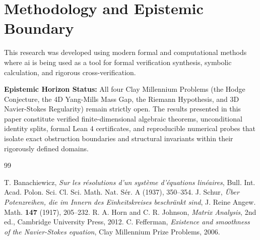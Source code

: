 \documentclass[11pt,a4paper]{article}
\theoremstyle{definition}
\begin{document}
\section{Methodology and Epistemic Boundary}
\noindent This research was developed using modern formal and computational methods where ai is being used as a tool for formal verification synthesis, symbolic calculation, and rigorous cross-verification.

\vspace{0.5em}
\noindent\textbf{Epistemic Horizon Status:} All four Clay Millennium Problems (the Hodge Conjecture, the 4D Yang-Mills Mass Gap, the Riemann Hypothesis, and 3D Navier-Stokes Regularity) remain strictly open. The results presented in this paper constitute verified finite-dimensional algebraic theorems, unconditional identity splits, formal Lean 4 certificates, and reproducible numerical probes that isolate exact obstruction boundaries and structural invariants within their rigorously defined domains.

\begin{thebibliography}{99}

 T. Banachiewicz, \emph{Sur les r\'esolutions d'un syst\`eme d'\'equations lin\'eaires}, Bull. Int. Acad. Polon. Sci. Cl. Sci. Math. Nat. S\'er. A (1937), 350--354.
 J. Schur, \emph{\"Uber Potenzreihen, die im Innern des Einheitskreises beschr\"ankt sind}, J. Reine Angew. Math. \textbf{147} (1917), 205--232.
 R. A. Horn and C. R. Johnson, \emph{Matrix Analysis}, 2nd ed., Cambridge University Press, 2012.
 C. Fefferman, \emph{Existence and smoothness of the Navier-Stokes equation}, Clay Millennium Prize Problems, 2006.

\end{thebibliography}
\end{document}
